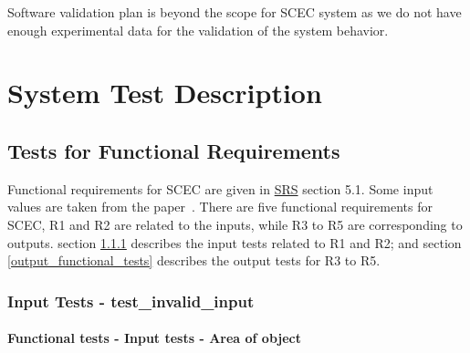 \documentclass[12pt, titlepage]{article}
\begin{document}
Software validation plan is beyond the scope for SCEC system as we do not have enough experimental data for the validation of the system behavior.

\section{System Test Description}
\label{systemtests}
	
\subsection{Tests for Functional Requirements}

Functional requirements for SCEC are given in \href{https://github.com/DeeshaPatel/CAS-741-Solar-Cooker/blob/7c53c8d9a19ca2f94dfba6ba9208eae0bf03b8cc/docs/SRS/SRS.pdf}{SRS} section 5.1. Some input values are taken from the paper~\cite{MathsModel}. There are five functional requirements for SCEC, R1 and R2 are related to the inputs, while R3 to R5 are corresponding to outputs. section \ref{input_functional_tests} describes the input tests related to R1 and R2; and section \ref{output_functional_tests} describes the output tests for R3 to R5.        


\subsubsection{Input Tests - test\_invalid\_input}
\label{input_functional_tests}

\paragraph{Functional tests - Input tests - Area of object}
\end{document}
